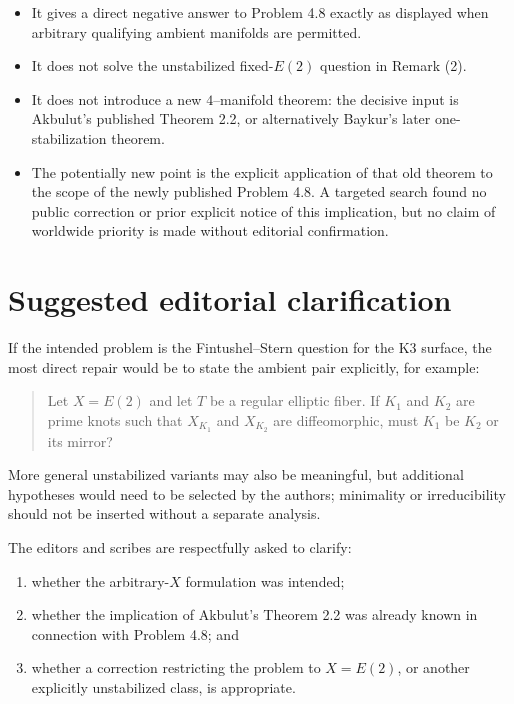 \documentclass[11pt]{article}
\theoremstyle{remark}
\begin{document}
\begin{itemize}[leftmargin=2em,itemsep=0.45em]
  \item It gives a direct negative answer to Problem 4.8 exactly as displayed
  when arbitrary qualifying ambient manifolds are permitted.
  \item It does not solve the unstabilized fixed-$E(2)$ question in
  Remark (2).
  \item It does not introduce a new $4$--manifold theorem: the decisive
  input is Akbulut's published Theorem 2.2, or alternatively Baykur's later
  one-stabilization theorem.
  \item The potentially new point is the explicit application of that old
  theorem to the scope of the newly published Problem 4.8.  A targeted
  search found no public correction or prior explicit notice of this
  implication, but no claim of worldwide priority is made without editorial
  confirmation.
\end{itemize}

\section{Suggested editorial clarification}

If the intended problem is the Fintushel--Stern question for the K3 surface,
the most direct repair would be to state the ambient pair explicitly, for
example:

\begin{quote}
Let $X=E(2)$ and let $T$ be a regular elliptic fiber.  If $K_1$ and $K_2$
are prime knots such that $X_{K_1}$ and $X_{K_2}$ are diffeomorphic, must
$K_1$ be $K_2$ or its mirror?
\end{quote}

More general unstabilized variants may also be meaningful, but additional
hypotheses would need to be selected by the authors; minimality or
irreducibility should not be inserted without a separate analysis.

The editors and scribes are respectfully asked to clarify:
\begin{enumerate}[leftmargin=2em,itemsep=0.35em]
  \item whether the arbitrary-$X$ formulation was intended;
  \item whether the implication of Akbulut's Theorem 2.2 was already known
  in connection with Problem 4.8; and
  \item whether a correction restricting the problem to $X=E(2)$, or another
  explicitly unstabilized class, is appropriate.
\end{enumerate}
\end{document}
